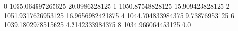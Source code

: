 0 1055.064697265625 20.0986328125
1 1050.87548828125 15.909423828125
2 1051.9317626953125 16.9656982421875
4 1044.704833984375 9.73876953125
6 1039.1802978515625 4.2142333984375
8 1034.966064453125 0.0
